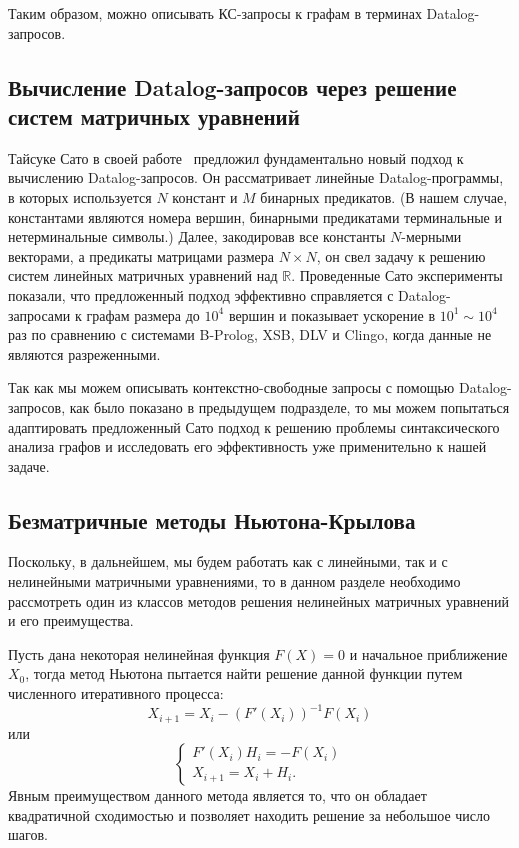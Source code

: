 \documentclass[12pt]{matmex-diploma-custom}
\begin{document}
Таким образом, можно описывать КС-запросы к графам в терминах Datalog-запросов.


\subsection{Вычисление Datalog-запросов через решение систем матричных уравнений}

Тайсуке Сато в своей работе~\cite{sato2017linear} предложил фундаментально новый подход к вычислению Datalog-запросов. 
Он рассматривает линейные Datalog-программы, в которых используется $N$ констант и $M$ бинарных предикатов. (В нашем случае, константами являются номера вершин, бинарными предикатами терминальные и нетерминальные символы.) Далее, закодировав все константы $N$-мерными векторами, а предикаты матрицами размера $N \times N$, он свел задачу к решению систем линейных матричных уравнений над $\mathbb{R}$.
Проведенные Сато эксперименты показали, что предложенный подход эффективно справляется с Datalog-запросами к графам размера до $10^4$ вершин и показывает ускорение в $10^1 \sim 10^4$ раз по сравнению с системами B-Prolog, XSB, DLV и Clingo, когда данные не являются разреженными. 

Так как мы можем описывать контекстно-свободные запросы с помощью Datalog-запросов, как было показано в предыдущем подразделе, то мы можем попытаться адаптировать предложенный Сато подход к решению проблемы синтаксического анализа графов и исследовать его эффективность уже применительно к нашей задаче.  


\subsection{Безматричные методы Ньютона-Крылова}

Поскольку, в дальнейшем, мы будем работать как с линейными, так и с нелинейными матричными уравнениями, то в данном разделе необходимо рассмотреть один из классов методов решения нелинейных матричных уравнений и его преимущества.

Пусть дана некоторая нелинейная функция $F(X) = 0$ и начальное приближение $X_0$, тогда метод Ньютона пытается найти решение данной функции путем численного итеративного процесса:
$$X_{i+1} = X_i - (F'(X_i))^{-1} F(X_i)$$ 
или
\begin{equation*}
  \begin{cases}
    F'(X_i) H_i = -F(X_i)\\
    X_{i+1} = X_i + H_i.
  \end{cases}
\end{equation*}
Явным преимуществом данного метода является то, что он обладает квадратичной сходимостью и позволяет находить решение за небольшое число шагов.
\end{document}

